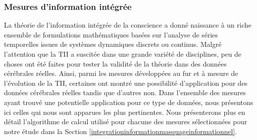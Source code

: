 \subsubsection{Mesures d'information intégrée}

La théorie de l'information intégrée de la conscience a donné naissance à un riche ensemble de formulations mathématiques basées sur l'analyse de séries temporelles issues de systèmes dynamiques discrets ou continus. 
Malgré l'attention que la TII a suscitée dans une grande variété de disciplines, peu de choses ont été faites pour tester la validité de la théorie dans des données cérébrales réelles.
Ainsi, parmi les mesures développées au fur et à mesure de l'évolution de la TII, certaines ont montré une possibilité d'application pour des données cérébrales réelles tandis que d'autres non. 
Dans l'ensemble des mesures ayant trouvé une potentielle application pour ce type de données, nous présentons ici celles qui nous sont apparues les plus pertinentes. 
Nous présenterons plus en détail l'algorithme de calcul utilisé pour chacune des mesures sélectionnées pour notre étude dans la Section \ref{integrationinformationmasquageinformationnel}. 

